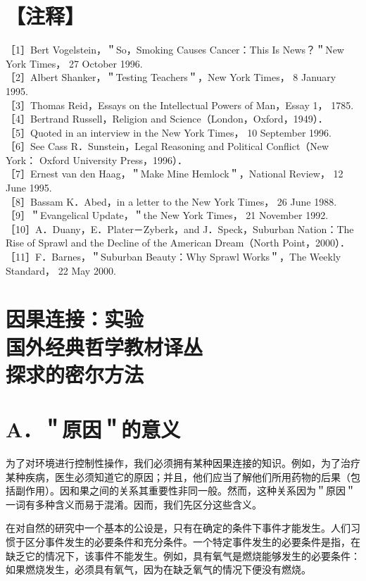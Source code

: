 \section*{【注释】}
［1］Bert Vogelstein，＂So，Smoking Causes Cancer：This Is News？＂New York Times， 27 October 1996.\\
［2］Albert Shanker，＂Testing Teachers＂，New York Times， 8 January 1995.\\
［3］Thomas Reid，Essays on the Intellectual Powers of Man，Essay 1， 1785.\\
［4］Bertrand Russell，Religion and Science（London，Oxford，1949）．\\
［5］Quoted in an interview in the New York Times， 10 September 1996.\\
［6］See Cass R．Sunstein，Legal Reasoning and Political Conflict（New York： Oxford University Press，1996）．\\
［7］Ernest van den Haag，＂Make Mine Hemlock＂，National Review， 12 June 1995.\\
［8］Bassam K．Abed，in a letter to the New York Times， 26 June 1988.\\
［9］＂Evangelical Update，＂the New York Times， 21 November 1992.\\
［10］A．Duany，E．Plater－Zyberk，and J．Speck，Suburban Nation：The Rise of Sprawl and the Decline of the American Dream（North Point，2000）．\\
［11］F．Barnes，＂Suburban Beauty：Why Sprawl Works＂，The Weekly Standard， 22 May 2000.

\section*{因果连接：实验 \\
 国外经典哲学教材译丛 \\
 探求的密尔方法 }


\section*{A．＂原因＂的意义}
为了对环境进行控制性操作，我们必须拥有某种因果连接的知识。例如，为了治疗某种疾病，医生必须知道它的原因；并且，他们应当了解他们所用药物的后果（包括副作用）。因和果之间的关系其重要性非同一般。然而，这种关系因为＂原因＂一词有多种含义而易于混淆。因而，我们先区分这些含义。

在对自然的研究中一个基本的公设是，只有在确定的条件下事件才能发生。人们习惯于区分事件发生的必要条件和充分条件。一个特定事件发生的必要条件是指，在缺乏它的情况下，该事件不能发生。例如，具有氧气是燃烧能够发生的必要条件：如果燃烧发生，必须具有氧气，因为在缺乏氧气的情况下便没有燃烧。

